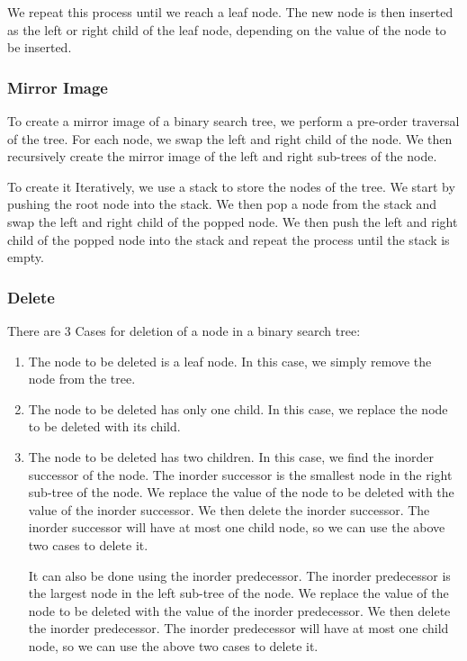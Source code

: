 \documentclass[11pt]{article}
\begin{document}
We repeat this process until we reach a leaf node. The new node is then inserted as the left or right child of the leaf node, depending on the value of the node to be inserted.
\subsubsection{Mirror Image}

To create a mirror image of a binary search tree, we perform a pre-order traversal of the tree. For each node, we swap the left and right child of the node. We then recursively create the mirror image of the left and right sub-trees of the node.

To create it Iteratively, we use a stack to store the nodes of the tree. We start by pushing the root node into the stack. We then pop a node from the stack and swap the left and right child of the popped node. We then push the left and right child of the popped node into the stack and repeat the process until the stack is empty.
\subsubsection{Delete}

There are 3 Cases for deletion of a node in a binary search tree:

\begin{enumerate}
	\item The node to be deleted is a leaf node. In this case, we simply remove the node from the tree.
	\item The node to be deleted has only one child. In this case, we replace the node to be deleted with its child.
	\item The node to be deleted has two children. In this case, we find the inorder successor of the node. The inorder successor is the smallest node in the right sub-tree of the node. We replace the value of the node to be deleted with the value of the inorder successor. We then delete the inorder successor. The inorder successor will have at most one child node, so we can use the above two cases to delete it.

	      It can also be done using the inorder predecessor. The inorder predecessor is the largest node in the left sub-tree of the node. We replace the value of the node to be deleted with the value of the inorder predecessor. We then delete the inorder predecessor. The inorder predecessor will have at most one child node, so we can use the above two cases to delete it.
\end{enumerate}
\end{document}
